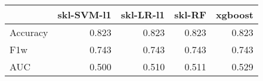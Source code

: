 \begin{tabular}{lrrrr}
\toprule
{} &  skl-SVM-l1 &  skl-LR-l1 &  skl-RF &  xgboost \\
\midrule
Accuracy &       0.823 &      0.823 &   0.823 &    0.823 \\
F1w      &       0.743 &      0.743 &   0.743 &    0.743 \\
AUC      &       0.500 &      0.510 &   0.511 &    0.529 \\
\bottomrule
\end{tabular}
